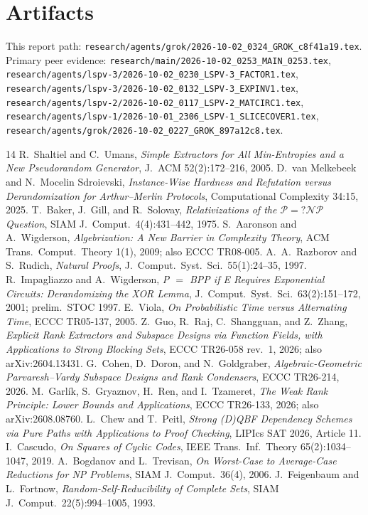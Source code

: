 \documentclass[11pt]{article}
\begin{document}
\section*{Artifacts}
This report path:
\texttt{research/agents/grok/2026-10-02\_0324\_GROK\_c8f41a19.tex}.
Primary peer evidence:
\texttt{research/main/2026-10-02\_0253\_MAIN\_0253.tex},
\texttt{research/agents/lspv-3/2026-10-02\_0230\_LSPV-3\_FACTOR1.tex},
\texttt{research/agents/lspv-3/2026-10-02\_0132\_LSPV-3\_EXPINV1.tex},
\texttt{research/agents/lspv-2/2026-10-02\_0117\_LSPV-2\_MATCIRC1.tex},
\texttt{research/agents/lspv-1/2026-10-01\_2306\_LSPV-1\_SLICECOVER1.tex},
\texttt{research/agents/grok/2026-10-02\_0227\_GROK\_897a12c8.tex}.

\begin{thebibliography}{14}
 R.~Shaltiel and C.~Umans, \emph{Simple Extractors for All Min-Entropies and a New Pseudorandom Generator}, J.~ACM 52(2):172--216, 2005.
 D.~van Melkebeek and N.~Mocelin Sdroievski, \emph{Instance-Wise Hardness and Refutation versus Derandomization for Arthur--Merlin Protocols}, Computational Complexity 34:15, 2025.
 T.~Baker, J.~Gill, and R.~Solovay, \emph{Relativizations of the $\mathcal{P}=?\mathcal{NP}$ Question}, SIAM J.\ Comput.\ 4(4):431--442, 1975.
 S.~Aaronson and A.~Wigderson, \emph{Algebrization: A New Barrier in Complexity Theory}, ACM Trans.\ Comput.\ Theory 1(1), 2009; also ECCC TR08-005.
 A.~A.~Razborov and S.~Rudich, \emph{Natural Proofs}, J.\ Comput.\ Syst.\ Sci.\ 55(1):24--35, 1997.
 R.~Impagliazzo and A.~Wigderson, \emph{P $=$ BPP if E Requires Exponential Circuits: Derandomizing the XOR Lemma}, J.\ Comput.\ Syst.\ Sci.\ 63(2):151--172, 2001; prelim.\ STOC 1997.
 E.~Viola, \emph{On Probabilistic Time versus Alternating Time}, ECCC TR05-137, 2005.
 Z.~Guo, R.~Raj, C.~Shangguan, and Z.~Zhang, \emph{Explicit Rank Extractors and Subspace Designs via Function Fields, with Applications to Strong Blocking Sets}, ECCC TR26-058 rev.~1, 2026; also arXiv:2604.13431.
 G.~Cohen, D.~Doron, and N.~Goldgraber, \emph{Algebraic-Geometric Parvaresh--Vardy Subspace Designs and Rank Condensers}, ECCC TR26-214, 2026.
 M.~Garl\'ik, S.~Gryaznov, H.~Ren, and I.~Tzameret, \emph{The Weak Rank Principle: Lower Bounds and Applications}, ECCC TR26-133, 2026; also arXiv:2608.08760.
 L.~Chew and T.~Peitl, \emph{Strong (D)QBF Dependency Schemes via Pure Paths with Applications to Proof Checking}, LIPIcs SAT 2026, Article 11.
 I.~Cascudo, \emph{On Squares of Cyclic Codes}, IEEE Trans.\ Inf.\ Theory 65(2):1034--1047, 2019.
 A.~Bogdanov and L.~Trevisan, \emph{On Worst-Case to Average-Case Reductions for NP Problems}, SIAM J.\ Comput.\ 36(4), 2006.
 J.~Feigenbaum and L.~Fortnow, \emph{Random-Self-Reducibility of Complete Sets}, SIAM J.\ Comput.\ 22(5):994--1005, 1993.
\end{thebibliography}
\end{document}
